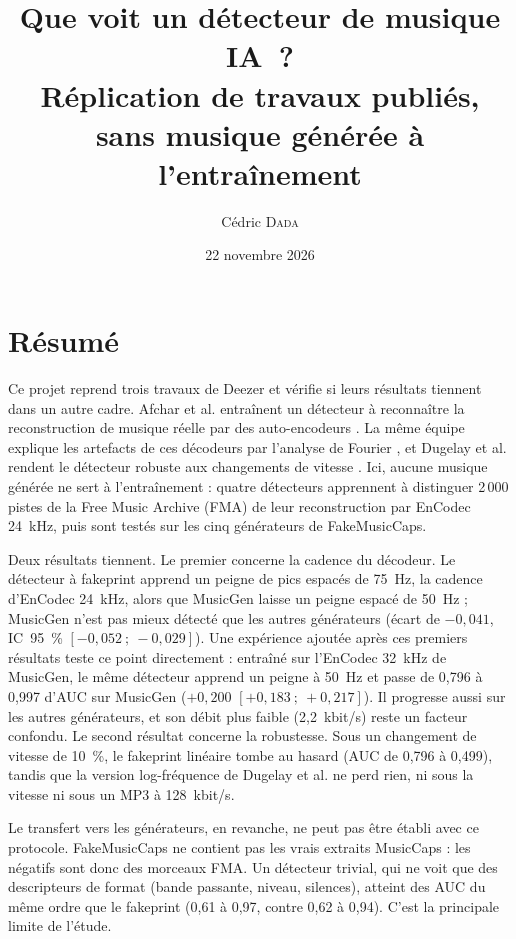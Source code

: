 \documentclass[a4paper, 11pt]{article}
\title{Que voit un détecteur de musique IA~?\\[0.4em]
{\Large Réplication de travaux publiés, sans musique générée à l'entraînement}}
\author{Cédric \textsc{Dada}}
\date{22 novembre 2026}
\begin{document}
\maketitle

\section*{Résumé}

Ce projet reprend trois travaux de Deezer et vérifie si leurs résultats tiennent dans un autre cadre. Afchar et
al. entraînent un détecteur à reconnaître la reconstruction de musique réelle par des auto-encodeurs
\cite{afchar2024easy, afchar2025challenges}. La même équipe explique les artefacts de ces décodeurs par
l'analyse de Fourier \cite{afchar2025fourier}, et Dugelay et al. rendent le détecteur robuste aux changements de
vitesse \cite{dugelay2026robustness}. Ici, aucune musique générée ne sert à l'entraînement : quatre détecteurs
apprennent à distinguer 2\,000 pistes de la Free Music Archive (FMA) de leur reconstruction par EnCodec 24~kHz,
puis sont testés sur les cinq générateurs de FakeMusicCaps.

Deux résultats tiennent. Le premier concerne la cadence du décodeur. Le détecteur à fakeprint apprend un peigne
de pics espacés de 75~Hz, la cadence d'EnCodec 24~kHz, alors que MusicGen laisse un peigne espacé de 50~Hz ;
MusicGen n'est pas mieux détecté que les autres générateurs (écart de $-0{,}041$, IC~95~\%
$[-0{,}052~;~-0{,}029]$). Une expérience ajoutée après ces premiers résultats teste ce point directement :
entraîné sur l'EnCodec 32~kHz de MusicGen, le même détecteur apprend un peigne à 50~Hz et passe de 0,796 à 0,997
d'AUC sur MusicGen ($+0{,}200$ $[+0{,}183~;~+0{,}217]$). Il progresse aussi sur les autres générateurs, et son
débit plus faible (2,2~kbit/s) reste un facteur confondu. Le second résultat concerne la robustesse. Sous un
changement de vitesse de 10~\%, le fakeprint linéaire tombe au hasard (AUC de 0,796 à 0,499), tandis que la
version log-fréquence de Dugelay et al. ne perd rien, ni sous la vitesse ni sous un MP3 à 128~kbit/s.

Le transfert vers les générateurs, en revanche, ne peut pas être établi avec ce protocole. FakeMusicCaps ne
contient pas les vrais extraits MusicCaps : les négatifs sont donc des morceaux FMA. Un détecteur trivial, qui ne
voit que des descripteurs de format (bande passante, niveau, silences), atteint des AUC du même ordre que le
fakeprint (0,61 à 0,97, contre 0,62 à 0,94). C'est la principale limite de l'étude.
\end{document}
